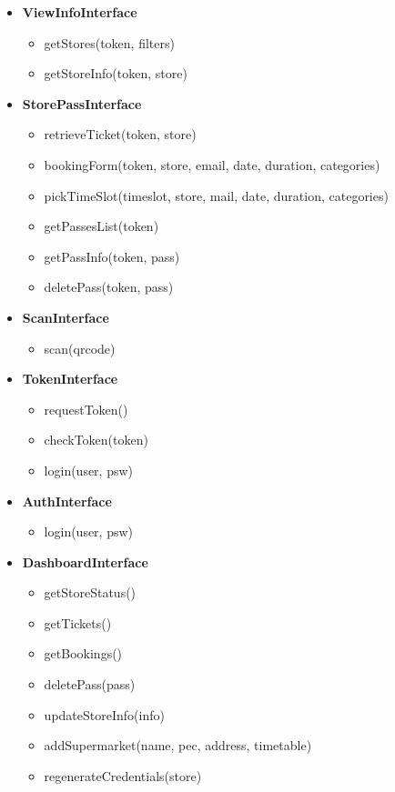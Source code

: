 \begin{itemize}
	\item \textbf{ViewInfoInterface}
	\begin{itemize}
		\item getStores(token, filters)
		\item getStoreInfo(token, store)
	\end{itemize}

	
	\item \textbf{StorePassInterface}
	\begin{itemize}
		\item retrieveTicket(token, store)
		\item bookingForm(token, store, email, date, duration, categories)
		\item pickTimeSlot(timeslot, store, mail, date, duration, categories)
		\item getPassesList(token)
		\item getPassInfo(token, pass)
		\item deletePass(token, pass)
	\end{itemize}

	\item \textbf{ScanInterface}
	\begin{itemize}
		\item scan(qrcode)
	\end{itemize}
	
	\item \textbf{TokenInterface}
	\begin{itemize}
		\item requestToken()
		\item checkToken(token)
		\item login(user, psw)
	\end{itemize}

	\item \textbf{AuthInterface}
	\begin{itemize}
		\item login(user, psw)
	\end{itemize}

	\item \textbf{DashboardInterface}
	\begin{itemize}
		\item getStoreStatus()
		\item getTickets()
		\item getBookings()
		\item deletePass(pass)
		\item updateStoreInfo(info)
		\item addSupermarket(name, pec, address, timetable)
		\item regenerateCredentials(store)
	\end{itemize}


\end{itemize}
